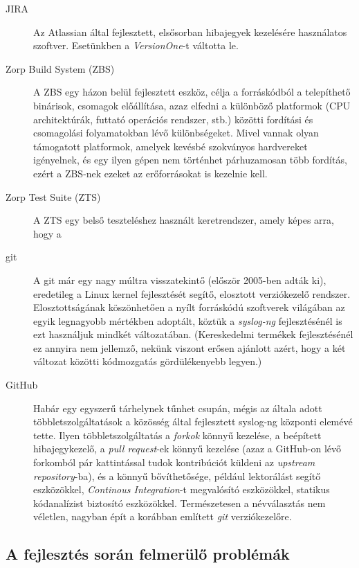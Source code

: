 \begin{description}
    \item[JIRA] {Az Atlassian által fejlesztett, elsősorban hibajegyek kezelésére használatos
        szoftver. Esetünkben a \emph{VersionOne}-t váltotta le.}
    \item[Zorp Build System (ZBS)] {A ZBS egy házon belül fejlesztett eszköz, célja a forráskódból
        a telepíthető binárisok, csomagok előállítása, azaz elfedni a különböző platformok (CPU
        architektúrák, futtató operációs rendszer, stb.) közötti fordítási és csomagolási
        folyamatokban lévő különbségeket. Mivel vannak olyan támogatott platformok, amelyek
        kevésbé szokványos hardvereket igényelnek, és egy ilyen gépen nem történhet párhuzamosan
        több fordítás, ezért a ZBS-nek ezeket az erőforrásokat is kezelnie kell. }
    \item[Zorp Test Suite (ZTS)] { A ZTS egy belső teszteléshez használt keretrendszer, amely
        képes arra, hogy a}
    \item[git] {A git már egy nagy múltra visszatekintő (először 2005-ben adták ki), eredetileg a
        Linux kernel fejlesztését segítő, elosztott verziókezelő rendszer. Elosztottságának
        köszönhetően a nyílt forráskódú szoftverek világában az egyik legnagyobb mértékben
        adoptált, köztük a \emph{syslog-ng} fejlesztésénél is ezt használjuk mindkét változatában.
        (Kereskedelmi termékek fejlesztésénél ez annyira nem jellemző, nekünk viszont erősen
        ajánlott azért, hogy a két változat közötti kódmozgatás gördülékenyebb legyen.)}
    \item[GitHub] {Habár egy egyszerű tárhelynek tűnhet csupán, mégis az általa adott
        többletszolgáltatások a közösség által fejlesztett syslog-ng központi elemévé tette.
        Ilyen többletszolgáltatás a \emph{forkok} könnyű kezelése, a beépített hibajegykezelő,
        a \emph{pull request}-ek könnyű kezelése (azaz a GitHub-on lévő forkomból pár
        kattintással tudok kontribúciót küldeni az \emph{upstream repository}-ba), és a könnyű
        bővíthetősége, például lektorálást segítő eszközökkel, \emph{Continous Integration}-t
        megvalósító eszközökkel, statikus kódanalízist biztosító eszközökkel.
        Természetesen a névválasztás nem véletlen, nagyban épít a korábban említett \emph{git}
        verziókezelőre.}
\end{description}

\subsection{A fejlesztés során felmerülő problémák}

